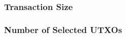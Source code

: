     \subsubsection{Transaction Size}
      \begin{figure}[H]
      \end{figure}
    \subsubsection{Number of Selected UTXOs}
      \begin{figure}[H]
      \end{figure}

